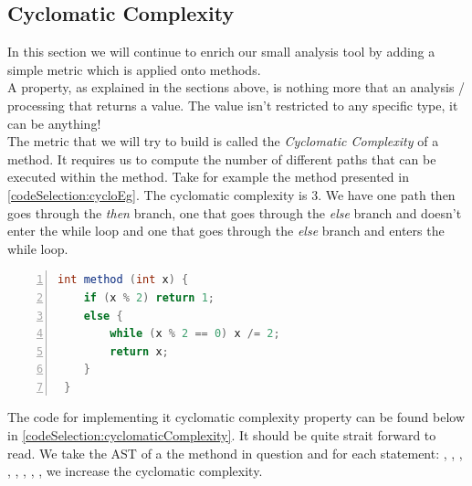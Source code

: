 \subsection{Cyclomatic Complexity}

        In this section we will continue to enrich our small analysis tool by adding a simple metric which is applied onto methods. \\
        A property, as explained in the sections above, is nothing more that an analysis / processing that returns a value. The value isn't restricted to any
specific type, it can be anything! \\
        The metric that we will try to build is called the \textit{Cyclomatic Complexity} of a method. It requires us to compute the number of different paths
that can be executed within the method. Take for example the method presented in \ref{codeSelection:cycloEg}. The cyclomatic complexity is 3. We have one path
then goes through the \textit{then} branch, one that goes through the \textit{else} branch and doesn't enter the while loop and one that goes through the \textit{else}
branch and enters the while loop. 

\small
\begin{lstlisting}[language=Java,numbers=left]
 int method (int x) {
    if (x % 2) return 1;
    else {
        while (x % 2 == 0) x /= 2;
        return x;
    }
 }
\end{lstlisting}
\normalsize{}\label{codeSelection:cycloEg}

        The code for implementing it cyclomatic complexity property can be found below in \ref{codeSelection:cyclomaticComplexity}.
It should be quite strait forward to read. We take the AST of a the methond in question and for each statement: , 
, , , , , , ,  we increase the 
cyclomatic complexity.

